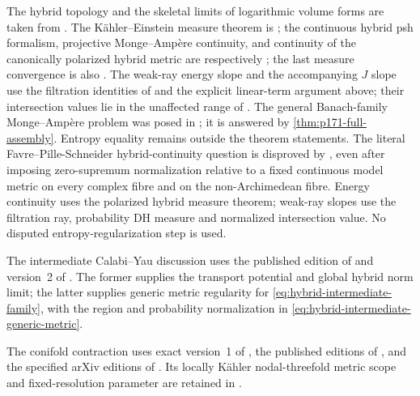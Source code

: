 The hybrid topology and the skeletal limits of logarithmic volume
forms are taken from \cite{BJ17Hybrid}. The K\"ahler--Einstein
measure theorem is \cite[Theorem~A]{PS22HybridKE}; the continuous hybrid
psh formalism, projective Monge--Amp\`ere continuity, and continuity of
the canonically polarized hybrid metric are respectively
\cite[Theorems~3.13, 4.11, and~5.1]{PS23Hybrid}; the last measure
convergence is also \cite[Corollary~5.2]{PS23Hybrid}.
The weak-ray energy slope and the accompanying $J$ slope use the
filtration identities of  and the explicit
linear-term argument above; their intersection values lie in the
unaffected range of \cite{BHJ17,BHJ19}. The general
Banach-family Monge--Amp\`ere problem was posed in
\cite[Question~4.9]{PS23Hybrid}; it is answered by
\cref{thm:p171-full-assembly}.  Entropy equality remains outside the
theorem statements.  The literal
Favre--Pille-Schneider hybrid-continuity question is disproved by
, even after imposing
zero-supremum normalization relative to a fixed continuous model metric on
every complex fibre and on the non-Archimedean fibre.
Energy continuity uses the polarized hybrid measure theorem; weak-ray
slopes use the filtration ray, probability DH measure and normalized
intersection value. No disputed entropy-regularization step is used.

The intermediate Calabi--Yau discussion uses the published edition of
\cite{Li25Intermediate} and version~2 of \cite{LT26Intermediate}.
The former supplies the transport potential and global hybrid norm limit;
the latter supplies generic metric regularity for
\eqref{eq:hybrid-intermediate-family}, with the region and probability
normalization in \eqref{eq:hybrid-intermediate-generic-metric}.

The conifold contraction uses exact version~1 of
\cite{GuyettMcGowan26ConifoldV1}, the published editions of
\cite{Zhang25TangentConesPublished,GuedjLu22VolumesPublished,BoucksomGuedjLu25VolumesPublished},
and the specified arXiv editions of
\cite{Song12ConifoldV1,GuedjLu21Envelopes3V1}.
Its locally K\"ahler nodal-threefold metric scope and fixed-resolution
parameter are retained in .

